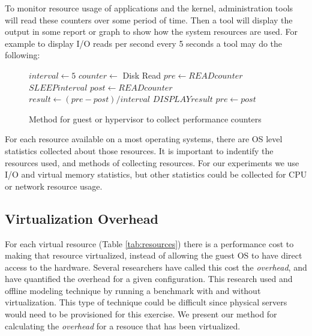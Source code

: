 \begin{comment}
The hypervisor divides the physical resource into virtual resources for each guest.  
Additionally, each resource may be shared between multiple guests by overcommitting the resource.  
When a guest system views statistics about a resource, part of the information is missing from the guest application.  
Interference from the hypervisor and external guests need to be passed to the guest virtual machine about the true performance of the resource. 
\end{comment}

\indent To monitor resource usage of applications and the kernel, administration tools will read these counters over some period of time.  
Then a tool will display the output in some report or graph to show how the system resources are used.
For example to display I/O reads per second every 5 seconds a tool may do the following:
\begin{figure}[h]
\begin{algorithmic}[H]
 \STATE $interval \gets 5$
 \STATE $counter \gets$  Disk Read
 \STATE $pre \gets READ counter$ 
 \LOOP
    \STATE $SLEEP  interval$
    \STATE $post \gets READ  counter$
    \STATE $result \gets (pre - post)/interval$
    \STATE $DISPLAY  result$
    \STATE $pre \gets post$ 
 \ENDLOOP
\end{algorithmic}
\label{alg1}
\caption{Method for guest or hypervisor to collect performance counters}
\end{figure}

\indent For each resource available on a most operating systems, there are OS level statistics collected about those resources.  It is important to indentify the resources used, and methods of collecting resources.  
For our experiments we use I/O and virtual memory statistics, but other statistics could be collected for CPU or network resource usage.

\subsection{Virtualization Overhead}
For each virtual resource (Table \ref{tab:resources}) there is a performance cost to making that resource virtualized, instead of allowing the guest OS to have direct access to the hardware.  
Several researchers \cite{cherkasova, huber1} have called this cost the \emph{overhead}, and have quantified the overhead for a given configuration.  This research used and offline modeling technique by running a benchmark with and without virtualization.  
This type of technique could be difficult since physical servers would need to be provisioned for this exercise.  We present our method for calculating the \emph{overhead} for a resouce that has been virtualized.


